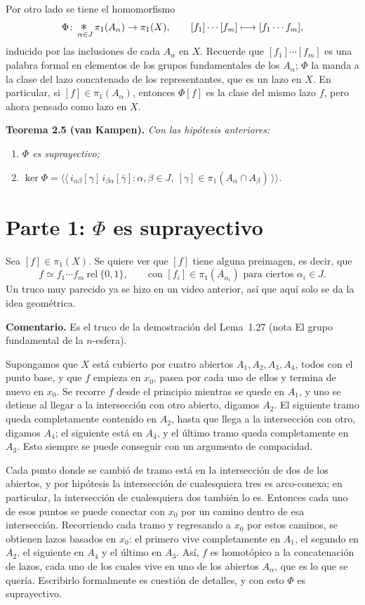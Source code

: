 \documentclass[11pt]{article}
\begin{document}
Por otro lado se tiene el homomorfismo
\[
  \Phi\colon \mathop{\scalebox{1.4}{$*$}}_{\alpha\in J}\pi_1(A_\alpha)\to\pi_1(X),\qquad [f_1]\cdots[f_m]\longmapsto[f_1\cdots f_m],
\]
inducido por las inclusiones de cada $A_\alpha$ en $X$. Recuerde que $[f_1]\cdots[f_m]$ es una palabra formal en elementos de los grupos fundamentales de los $A_\alpha$; $\Phi$ la manda a la clase del lazo concatenado de los representantes, que es un lazo en $X$. En particular, si $[f]\in\pi_1(A_\alpha)$, entonces $\Phi[f]$ es la clase del mismo lazo $f$, pero ahora pensado como lazo en $X$.

\noindent\textbf{Teorema 2.5 (van Kampen).} \textit{Con las hipótesis anteriores:}
\begin{enumerate}
  \item \textit{$\Phi$ es suprayectivo;}
  \item \textit{$\ker\Phi=\bigl\langle\!\bigl\langle\, i_{\alpha\beta}[\gamma]\,i_{\beta\alpha}[\bar\gamma] : \alpha,\beta\in J,\ [\gamma]\in\pi_1(A_\alpha\cap A_\beta)\,\bigr\rangle\!\bigr\rangle$.}
\end{enumerate}

\section*{Parte 1: $\Phi$ es suprayectivo}

Sea $[f]\in\pi_1(X)$. Se quiere ver que $[f]$ tiene alguna preimagen, es decir, que
\[
  f\simeq f_1\cdots f_m\ \mathrm{rel}\ \{0,1\},\qquad\text{con }[f_i]\in\pi_1(A_{\alpha_i})\text{ para ciertos }\alpha_i\in J.
\]
Un truco muy parecido ya se hizo en un video anterior, así que aquí solo se da la idea geométrica.

\noindent\textbf{Comentario.} Es el truco de la demostración del Lema~1.27 (nota \guillemotleft{}El grupo fundamental de la $n$-esfera\guillemotright{}).

\medskip
Supongamos que $X$ está cubierto por cuatro abiertos $A_1,A_2,A_3,A_4$, todos con el punto base, y que $f$ empieza en $x_0$, pasea por cada uno de ellos y termina de nuevo en $x_0$. Se recorre $f$ desde el principio mientras se quede en $A_1$, y uno se detiene al llegar a la intersección con otro abierto, digamos $A_2$. El siguiente tramo queda completamente contenido en $A_2$, hasta que llega a la intersección con otro, digamos $A_4$; el siguiente está en $A_4$, y el último tramo queda completamente en $A_3$. Esto siempre se puede conseguir con un argumento de compacidad.

Cada punto donde se cambió de tramo está en la intersección de dos de los abiertos, y por hipótesis la intersección de cualesquiera tres es arco-conexa; en particular, la intersección de cualesquiera dos también lo es. Entonces cada uno de esos puntos se puede conectar con $x_0$ por un camino dentro de esa intersección. Recorriendo cada tramo y regresando a $x_0$ por estos caminos, se obtienen lazos basados en $x_0$: el primero vive completamente en $A_1$, el segundo en $A_2$, el siguiente en $A_4$ y el último en $A_3$. Así, $f$ es homotópico a la concatenación de lazos, cada uno de los cuales vive en uno de los abiertos $A_\alpha$, que es lo que se quería. Escribirlo formalmente es cuestión de detalles, y con esto $\Phi$ es suprayectivo.
\end{document}
